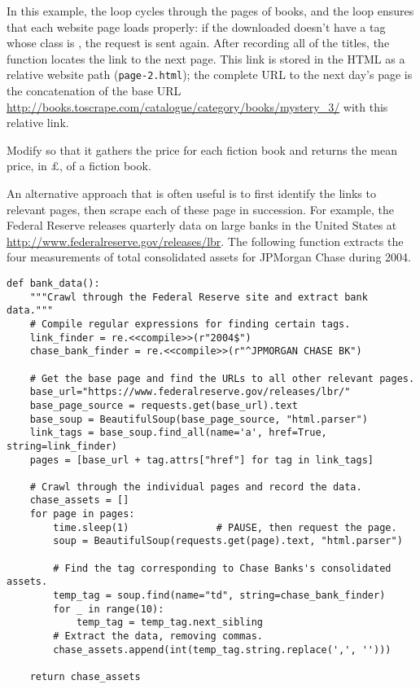 In this example, the  loop cycles through the pages of books, and the  loop ensures that each website page loads properly: if the downloaded  doesn't have a tag whose class is , the request is sent again.
After recording all of the titles, the function locates the link to the next page.
This link is stored in the HTML as a relative website path (\texttt{page-2.html}); the complete URL to the next day's page is the concatenation of the base URL \url{http://books.toscrape.com/catalogue/category/books/mystery_3/} with this relative link.

\begin{problem} %
Modify  so that it gathers the price for each fiction book and returns the mean price, in $\pounds$, of a fiction book.

\end{problem}

An alternative approach that is often useful is to first identify the links to relevant pages, then scrape each of these page in succession.
For example, the Federal Reserve releases quarterly data on large banks in the United States at \url{http://www.federalreserve.gov/releases/lbr}.
The following function extracts the four measurements of total consolidated assets for JPMorgan Chase during 2004.

\begin{lstlisting}
def bank_data():
    """Crawl through the Federal Reserve site and extract bank data."""
    # Compile regular expressions for finding certain tags.
    link_finder = re.<<compile>>(r"2004$")
    chase_bank_finder = re.<<compile>>(r"^JPMORGAN CHASE BK")

    # Get the base page and find the URLs to all other relevant pages.
    base_url="https://www.federalreserve.gov/releases/lbr/"
    base_page_source = requests.get(base_url).text
    base_soup = BeautifulSoup(base_page_source, "html.parser")
    link_tags = base_soup.find_all(name='a', href=True, string=link_finder)
    pages = [base_url + tag.attrs["href"] for tag in link_tags]

    # Crawl through the individual pages and record the data.
    chase_assets = []
    for page in pages:
        time.sleep(1)               # PAUSE, then request the page.
        soup = BeautifulSoup(requests.get(page).text, "html.parser")

        # Find the tag corresponding to Chase Banks's consolidated assets.
        temp_tag = soup.find(name="td", string=chase_bank_finder)
        for _ in range(10):
            temp_tag = temp_tag.next_sibling
        # Extract the data, removing commas.
        chase_assets.append(int(temp_tag.string.replace(',', '')))

    return chase_assets
\end{lstlisting}

